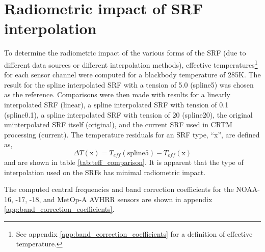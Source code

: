 \section{Radiometric impact of SRF interpolation}
To determine the radiometric impact of the various forms of the SRF (due to different data sources or different interpolation methods), effective temperatures\footnote{See appendix \ref{app:band_correction_coefficients} for a definition of effective temperature.} for each sensor channel were computed for a blackbody temperature of 285K. The result for the spline interpolated SRF with a tension of 5.0 (spline5) was chosen as the reference. Comparisons were then made with results for a linearly interpolated SRF (linear), a spline interpolated SRF with tension of 0.1 (spline0.1), a spline interpolated SRF with tension of 20 (spline20), the original uninterpolated SRF itself (original), and the current SRF used in CRTM processing (current). The temperature residuals for an SRF type, ``x'', are defined as,
\begin{equation}
  \Delta T(\textrm{x}) = T_{eff}(\textrm{spline5}) - T_{eff}(\textrm{x})
\end{equation}
and are shown in table \ref{tab:teff_comparison}. It is apparent that the type of interpolation used on the SRFs has minimal radiometric impact.

The computed central frequencies and band correction coefficients for the NOAA-16, -17, -18, and MetOp-A AVHRR sensors are shown in appendix \ref{app:band_correction_coefficients}.

